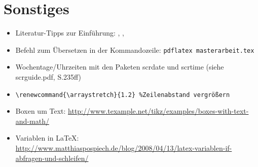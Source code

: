 
\section{Sonstiges}
\begin{itemize}
\item Literatur-Tipps zur Einführung: \cite{l2kurz}, \cite{l2tabu}, \cite{typokurz}
	\item Befehl zum Übersetzen in der Kommandozeile: \lstinline|pdflatex masterarbeit.tex|
	
\item Wochentage/Uhrzeiten mit den Paketen scrdate und scrtime (siehe scrguide.pdf, S.235ff)	
\item \lstinline|\renewcommand{\arraystretch}{1.2} %Zeilenabstand vergrößern|

\item {} Boxen um Text: \url{http://www.texample.net/tikz/examples/boxes-with-text-and-math/}

\item Variablen in \LaTeX: \url{http://www.matthiaspospiech.de/blog/2008/04/13/latex-variablen-if-abfragen-und-schleifen/}
\end{itemize}



